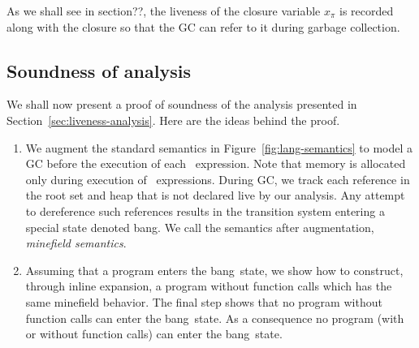 \documentclass[9pt]{sigplanconf}
\newcommand{\added}[1]{#1}
\newcommand{\bang}{\mbox{\sc bang}}
\begin{document}
{\color{Myblue}
As we shall see in section??, the liveness of the closure variable $x_{\pi}$
is recorded along with the closure so that the GC can refer to it
during garbage collection. 
}


\subsection{Soundness of analysis}  

We shall now present a proof of soundness of the analysis presented in
Section~\ref{sec:liveness-analysis}.   Here are  the ideas  behind the
proof.
\begin{enumerate}
\item       We       augment        the       standard       semantics in
  Figure~\ref{fig:lang-semantics} to model a GC before the execution
  of each \LET\ expression. {\color{Myblue}Note  that memory is allocated only during
  execution of \LET\  expressions}. During GC, we  track each reference
  in the root set and heap that is not declared live by our analysis.
Any  attempt to dereference such references results
  in the transition system entering  a special state denoted \bang.
We
  call the semantics after augmentation, \emph{minefield semantics}.

\item \label{inline1} Assuming that a program enters the \bang\ state,
  we  show  how to  construct,  through  inline expansion,  a  program
  without function  calls which has  the same minefield  behavior. The
  final step shows that no program  without function calls can enter the
  \bang\ state. As a consequence  no program (with or without function
  calls) can enter the \bang\ state.
\end{enumerate}
\end{document}
